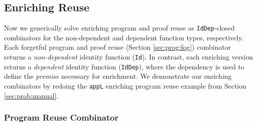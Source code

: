 \documentclass[acmsmall,screen]{acmart}
\newcommand{\refsec}[1]{Section \ref{sec:#1}}
\newcommand{\labsec}[1]{\label{sec:#1}}
\begin{document}
\subsection{Enriching Reuse}
\labsec{prog:enr}

Now we generically solve
enriching program and proof reuse as \verb;IdDep;-closed
combinators for the non-dependent and dependent function types,
respectively.
Each forgetful program and proof reuse (\refsec{prog:fog})
combinator returns a \textit{non-dependent} identity function (\verb;Id;). In
contrast, each enriching version returns a \textit{dependent}
identity function (\verb;IdDep;), where the dependency is used to
define the \textit{premise} necessary for enrichment.
We demonstrate our enriching combinators by
redoing the \verb;appL; enriching program reuse example from
\refsec{prob:manual}.

\subsubsection{Program Reuse Combinator}
\end{document}
